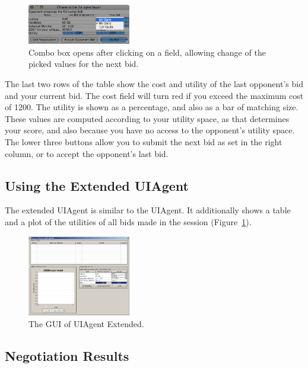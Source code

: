 \documentclass[]{article}
\begin{document}
	\begin{figure}[htb]
		\centering
		\includegraphics[width=0.4\textwidth]{media/image13.png}
	\caption{Combo box opens after clicking on a field, allowing change of the picked values for the next bid.}
	\end{figure}

	The last two rows of the table show the cost and utility of the last opponent's bid and your current bid. The cost field will turn red if you exceed the maximum cost of 1200. The utility is shown as a percentage, and also as a bar of matching size. These values are computed according to your utility space, as that determines your score, and also because you have no access to the opponent's utility space. The lower three buttons allow you to submit the next bid as set in the right column, or to accept the opponent's last bid.

	\subsection{Using the Extended UIAgent}

	The extended UIAgent is similar to the UIAgent. It additionally shows a table and a plot of the utilities of all bids made in the session (Figure~\ref{Fig:uiagent extended gui}).

	\begin{figure}[htb]
		\centering
		\includegraphics[width=0.4\textwidth]{media/image14.png}
	\caption{The GUI of UIAgent Extended.}\label{Fig:uiagent extended gui}
	\end{figure}

\subsection{Negotiation Results}
\end{document}
